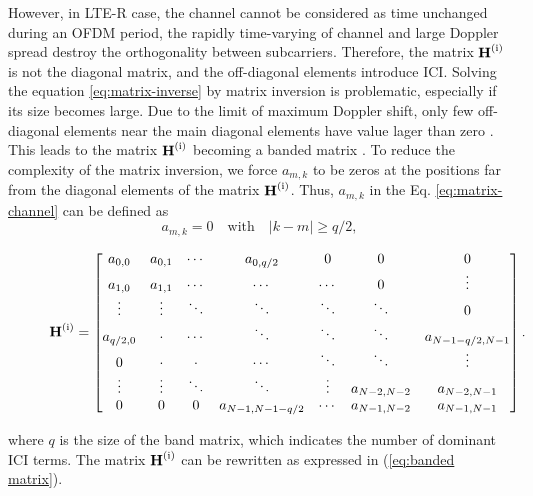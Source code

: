\documentclass[12pt,journal,draftclsnofoot,onecolumn]{IEEEtran}
\begin{document}
However, in LTE-R case, the channel cannot be considered as time  unchanged during an OFDM period, the rapidly time-varying of channel and large Doppler spread destroy the orthogonality between subcarriers. Therefore, the matrix $\rm{\textbf H^{(i)}}$ is not the diagonal matrix, and the off-diagonal elements introduce ICI. Solving  the equation \eqref{eq:matrix-inverse} by matrix inversion is problematic, especially if its size becomes large. Due to the limit of maximum Doppler shift, only few off-diagonal elements near the main diagonal elements have value lager than zero \cite{Jeon1999}. This leads to the matrix $\rm{\textbf H^{(i)}}$ becoming a banded matrix \cite{Cai2003}. To reduce the complexity of the matrix inversion, we force $a_{m,k}$ to be zeros at the positions far from the diagonal elements of the matrix $\rm{\textbf H^{(i)}}$. Thus,  $a_{m,k}$ in the Eq. \eqref{eq:matrix-channel} can be defined as
%
\begin{equation}
a_{m,k}=0\quad  \text{with}\quad  |k-m|\geqslant q/2,
\end{equation}
%
\begin{figure}
\begin{equation}\label{eq:banded matrix}
\begin{aligned}
		\rm {\textbf H^{(i)}} = \begin{bmatrix} 
		a_{0,0} & a_{0,1}& \cdots & a_{0,q/2} & 0 & 0 &0
		\\ a_{1,0} & a_{1,1} & \cdots & \cdots &\cdots& 0 & \vdots
		\\ \vdots & \vdots & \ddots & \ddots &\ddots & \ddots &0
		\\ a_{q/2,0} & \cdot & \cdots & \ddots & \ddots & \ddots & a_{N - 1 - q/2,N - 1}
		\\0&\cdot& \cdot& \cdots &\ddots& \ddots &\vdots
		\\ \vdots & \vdots & \ddots & \ddots & \vdots & a_{N - 2,N - 2}  & a_{N - 2,N - 1}
		\\0 &0&0 & a_{N - 1,N -1- q/2}& \cdots & a_{N - 1,N - 2}&a_{N - 1,N - 1}\end{bmatrix}.
	\end{aligned}
	\end{equation}
\end{figure}
where $q$ is the size of the band matrix, which indicates the number of dominant ICI terms. The matrix $\rm{\textbf H^{(i)}}$ can be rewritten as expressed in (\ref{eq:banded matrix}).
	
\end{document}
